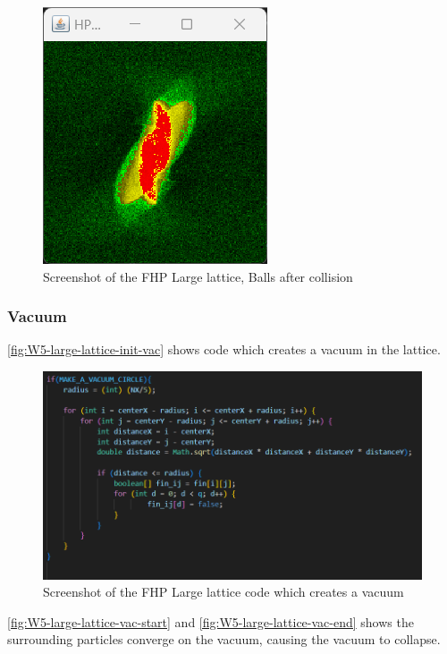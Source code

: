 \begin{figure}[H] 
   \centering
   \includegraphics[width=0.4\columnwidth]{Figures/Week 5/large-lattice/W5-after-collision.png}
   \caption{Screenshot of the FHP Large lattice, Balls after collision}
   \label{fig:W5-large-lattice-after-collision}
\end{figure}




\subsubsection{Vacuum}
\autoref{fig:W5-large-lattice-init-vac} shows code which creates a vacuum in the lattice.
\begin{figure}[H] 
   \centering
   \includegraphics[width=0.9\columnwidth]{Figures/Week 5/large-lattice/FHP large-lat make vaccum.png}
   \caption{Screenshot of the FHP Large lattice code which creates a vacuum}
   \label{fig:W5-large-lattice-init-vac}
\end{figure}

\autoref{fig:W5-large-lattice-vac-start} and \autoref{fig:W5-large-lattice-vac-end} shows the surrounding particles converge on the vacuum, causing the vacuum to collapse. 

